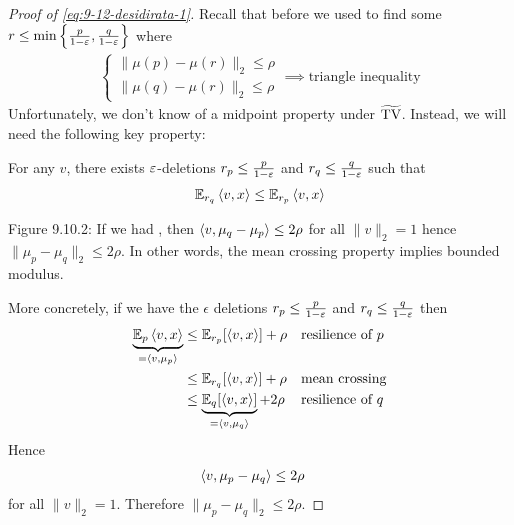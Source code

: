 \begin{proof}[Proof of \cref{eq:9-12-desidirata-1}]
    Recall that before we used  to find some $r \leq \min\left\{\frac{p}{1 - \varepsilon}, \frac{q}{1 - \varepsilon}\right\}$ where
    \begin{align}
        \begin{cases}
            \| \mu(p) - \mu(r) \|_2 \leq \rho \\
            \|\mu(q) - \mu(r) \|_2 \leq \rho
        \end{cases} \implies \text{triangle inequality}
    \end{align}
    Unfortunately, we don't know of a midpoint property under $\widetilde{\operatorname{TV}}$.
    Instead, we will need the following key property:
    
    \begin{lemma}\label{lem:mean-crossing-property}
        For any $v$, there exists $\varepsilon$-deletions $r_p \leq \frac{p}{1 - \varepsilon}$ and $r_q \leq \frac{q}{1 - \varepsilon}$ such that
        \begin{align}
            \mathbb{E}_{r_q} \braket{v,x} \leq \mathbb{E}_{r_p} \braket{v,x}
        \end{align}
    \end{lemma}
    
    Figure 9.10.2: If we had , then $\braket{v, \mu_q - \mu_p} \leq 2 \rho$ for all $\|v \|_2 = 1$ hence $\|\mu_p - \mu_q\|_2 \leq 2 \rho$. In other words, the mean crossing property implies bounded modulus.
    
    More concretely, if we have the $\epsilon$ deletions
    $r_p \leq \frac{p}{1 - \varepsilon}$ and $r_q \leq \frac{q}{1 - \varepsilon}$ then
    \begin{align}
        \underbrace{\mathbb{E}_p \braket{v,x}}_{=\braket{v, \mu_p}}
        &\leq \mathbb{E}_{r_p}[\braket{v,x}] + \rho &&\text{resilience of $p$} \\
        &\leq \mathbb{E}_{r_q}[\braket{v,x}] + \rho &&\text{mean crossing} \\
        &\leq \underbrace{\mathbb{E}_{q}[\braket{v,x}]}_{=\braket{v, \mu_q}} + 2\rho &&\text{resilience of $q$}
    \end{align}
    Hence
    \begin{align}
        \braket{v, \mu_p - \mu_q}
        &\leq 2 \rho
    \end{align}
    for all $\|v\|_2 = 1$. Therefore $\|\mu_p - \mu_q\|_2 \leq 2 \rho$.
\end{proof}

